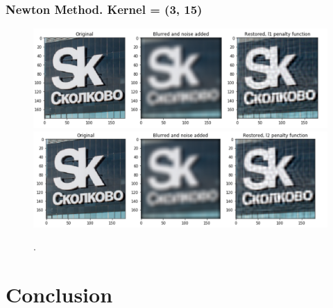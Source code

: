 \documentclass[hyperref={pdfpagelabels=false}]{beamer}
\begin{document}
\begin{frame}
\frametitle{Newton Method. Kernel = (3, 15)}

\begin{center}
\begin{figure}[h]
\begin{adjustwidth}{-0.2cm}{-0.5 cm}
\includegraphics[scale=0.27]{new_big_l1.png} \\
\includegraphics[scale=0.27]{new_big_l2.png} \\
\end{adjustwidth}
\caption{.}
\end{figure}
\end{center}

\end{frame}
\section{Conclusion} 
\end{document}

